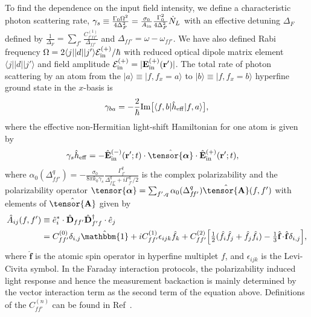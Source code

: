 \documentclass[preprint,aps,pra,onecolumn,superscriptaddress]{revtex4-1} %
\def\br{\mathbf{r}}
\def\bra#1{\langle{#1}\rvert}%
\def\ket#1{\lvert{#1}\rangle}%
\newcommand{\smallfrac}[2]{\mbox{$\frac{#1}{#2}$}}
\newcommand{\poltens}{\hat{\tensor{\boldsymbol{\alpha}}}}
\newcommand{\charpolq}{\alpha_0(\Delta_{f\!f'}^q)}
\begin{document}
\begin{appendix}
 
To find the dependence on the input field intensity, we define a characteristic photon scattering rate, $\gamma_s \equiv \frac{\Gamma_0\Omega^2}{4\Delta_{F}^2}= \frac{\sigma_0}{A_{\rm in}}\frac{\Gamma_0^2}{4 \Delta_{F}^2} \dot{N}_L $ with an effective detuning $ \Delta_F $ defined by $ \frac{1}{\Delta_F}=\sum_{f'}\frac{C_{f'ff'}^{(1)}}{\Delta_{ff'}} $ and $ \Delta_{ff'}=\omega-\omega_{ff'} $.
We have also defined Rabi frequency $ \Omega=2\bra{j}|d|\ket{j'}\mathcal{E}^{(+)}_{\rm in}/\hbar $ with reduced optical dipole matrix element $\bra{j}|d|\ket{j'}$ and field amplitude $ \mathcal{E}^{(+)}_{\rm in}=|\mathbf{E}_{\rm in}^{(+)}(\br')| $.
The total rate of photon scattering by an atom from the $\ket{a}\equiv \ket{f,f_x=a}$ to $ \ket{b}\equiv\ket{f,f_x=b} $ hyperfine ground state in the $x$-basis is
	\begin{equation}\label{Eq::gammaf}
		\gamma_{ba}=- \frac{2}{\hbar} {\rm Im} \big[ \bra{f,b} \hat{h}_{\rm eff}\ket{f,a} \big] ,
	\end{equation}
where the effective non-Hermitian light-shift Hamiltonian for one atom is given by
\begin{align}
\gamma_s\hat{h}_{\rm eff} &= - \hat{\mathbf{E}}^{(-)}_{\rm in}(\mathbf{r}' ; t ) \cdot \poltens \cdot \hat{\mathbf{E}}^{(+)}_{\rm in}(\mathbf{r}' ;t ),
\end{align}
where $\charpolq = -\frac{\sigma_0}{8\pi k_0\gamma_s}\frac{\Gamma_{f'}^q}{\Delta_{ff'}^q+i\Gamma_{f'}^q/2}$ is the complex polarizability and the polarizability operator $  \poltens=\sum_{f',q}\charpolq\hat{\tensor{\mathbf{A}}}(f,f')$ with elements of $ \hat{\tensor{\mathbf{A}}} $ given by
\begin{align} \label{Eq::PolarizabilityIrrep}
		\hat{A}_{ij}(f,f')&\equiv \hat{e}_i^*\cdot\hat{\mathbf{D}}_{ff'}\hat{\mathbf{D}}_{f'f}^\dagger \cdot \hat{e}_j \\
		&=  C_{ff'}^{(0)} \delta_{i,j}\hat{\mathbbm{1}}+ iC_{ff'}^{(1)}\epsilon_{ijk}\hat{f}_k+ C_{ff'}^{(2)} \Big[ \smallfrac{1}{2} ( \hat{f}_i\hat{f}_j +\hat{f}_j\hat{f}_i )-\smallfrac{1}{3} \hat{\mathbf{f}}\!\cdot\!\hat{\mathbf{f}} \delta_{i,j} \Big], 
\end{align}
where $\hat{\mathbf{f}}$ is the atomic spin operator in hyperfine multiplet $f$, and $ \epsilon_{ijk} $ is the Levi-Civita symbol. 
In the Faraday interaction protocols, the polarizability induced light response and hence the measurement backaction is mainly determined by the vector interaction term as the second term of the equation above.
Definitions of the $ C_{ff'}^{(n)} $ can be found in Ref~\cite{Qi2016}.


\end{appendix}
\end{document}
